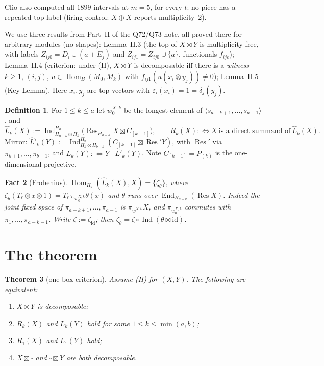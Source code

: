 \documentclass[11pt]{amsart}
\newcommand{\Hom}{\operatorname{Hom}}
\newcommand{\End}{\operatorname{End}}
\newcommand{\Ind}{\operatorname{Ind}}
\newcommand{\Res}{\operatorname{Res}}
\newcommand{\sq}{\boxtimes}
\newcommand{\bx}{\square}
\newcommand{\Lh}{\widehat L}
\theoremstyle{plain}
\newtheorem{theorem}{Theorem}
\newtheorem{fact}[theorem]{Fact}
\theoremstyle{definition}
\newtheorem{definition}[theorem]{Definition}
\begin{document}
Clio also computed all $1899$ intervals at $m=5$, for every $t$: no piece has a repeated top label (firing control: $X\oplus X$ reports multiplicity~$2$).

We use three results from Part~II of the Q72/Q73 note, all proved there for arbitrary modules (no shapes): Lemma~II.3 (the top of $X\sq Y$ is multiplicity-free, with labels $Z_{ij0}=D_i\cup(a+E_j)$ and $Z_{ij1}=Z_{ij0}\cup\{a\}$, functionals $f_{ije}$); Lemma~II.4 (criterion: under (H), $X\sq Y$ is decomposable iff there is a \emph{witness} $k\ge1$, $(i,j)$, $u\in\Hom_B(M_0,M_k)$ with $f_{ij1}(u(x_i\otimes y_j))\ne0$); Lemma~II.5 (Key Lemma). Here $x_i,y_j$ are top vectors with $\varepsilon_i(x_i)=1=\delta_j(y_j)$.

\begin{definition}
For $1\le k\le a$ let $w_0^{X,k}$ be the longest element of $\langle s_{a-k+1},\dots,s_{a-1}\rangle$, and
\[
\Lh_k(X):=\Ind_{H_{a-k}\otimes H_k}^{H_a}\bigl(\Res_{H_{a-k}}X\sq C_{[k-1]}\bigr),\qquad
R_k(X):\iff X\ \text{is a direct summand of}\ \Lh_k(X).
\]
Mirror: $\Lh'_k(Y):=\Ind_{H_k\otimes H_{b-k}}^{H_b}(C_{[k-1]}\sq\Res'Y)$, with $\Res'$ via $\pi_{k+1},\dots,\pi_{b-1}$, and $L_k(Y):\iff Y\mid\Lh'_k(Y)$. Note $C_{[k-1]}=P_{(k)}$ is the one-dimensional projective.
\end{definition}

\begin{fact}[Frobenius]\label{fact:F}
$\Hom_{H_a}(\Lh_k(X),X)=\{\zeta_\theta\}$, where $\zeta_\theta(T_\ell\otimes x\otimes1)=T_\ell\,\pi_{w_0^{X,k}}\theta(x)$ and $\theta$ runs over $\End_{H_{a-k}}(\Res X)$. Indeed the joint fixed space of $\pi_{a-k+1},\dots,\pi_{a-1}$ is $\pi_{w_0^{X,k}}X$, and $\pi_{w_0^{X,k}}$ commutes with $\pi_1,\dots,\pi_{a-k-1}$. Write $\zeta:=\zeta_{\mathrm{id}}$; then $\zeta_\theta=\zeta\circ\Ind(\theta\sq\mathrm{id})$.
\end{fact}

\section{The theorem}

\begin{theorem}[one-box criterion]\label{thm:box}
Assume (H) for $(X,Y)$. The following are equivalent:
\begin{enumerate}[label=(\arabic*),itemsep=1pt]
\item $X\sq Y$ is decomposable;
\item $R_k(X)$ and $L_k(Y)$ hold for some $1\le k\le\min(a,b)$;
\item $R_1(X)$ and $L_1(Y)$ hold;
\item $X\sq\bx$ and $\bx\sq Y$ are both decomposable.
\end{enumerate}
\end{theorem}
\end{document}
